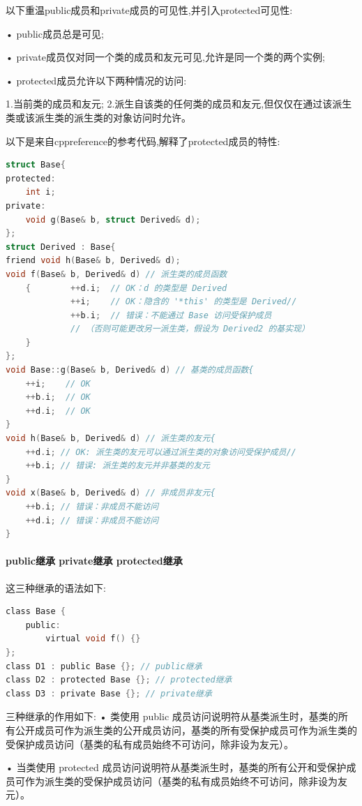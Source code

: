 \documentclass[UTF8]{ctexart}
\begin{document}
以下重温public成员和private成员的可见性,并引入protected可见性:

• public成员总是可见;

• private成员仅对同一个类的成员和友元可见,允许是同一个类的两个实例;

• protected成员允许以下两种情况的访问:

1.当前类的成员和友元;
2.派生自该类的任何类的成员和友元,但仅仅在通过该派生类或该派生类的派生类的对象访问时允许。

以下是来自cppreference的参考代码,解释了protected成员的特性:
\begin{lstlisting}[language = C,basicstyle=\small\ttfamily]
struct Base{
protected:    
    int i;
private:   
    void g(Base& b, struct Derived& d);
};
struct Derived : Base{    
friend void h(Base& b, Derived& d);    
void f(Base& b, Derived& d) // 派生类的成员函数    
    {        ++d.i;  // OK：d 的类型是 Derived        
             ++i;    // OK：隐含的 '*this' 的类型是 Derived//      
             ++b.i;  // 错误：不能通过 Base 访问受保护成员                
             // （否则可能更改另一派生类，假设为 Derived2 的基实现）    
    }
};
void Base::g(Base& b, Derived& d) // 基类的成员函数{    
    ++i;    // OK    
    ++b.i;  // OK   
    ++d.i;  // OK
}
void h(Base& b, Derived& d) // 派生类的友元{    
    ++d.i; // OK: 派生类的友元可以通过派生类的对象访问受保护成员// 
    ++b.i; // 错误: 派生类的友元并非基类的友元
}
void x(Base& b, Derived& d) // 非成员非友元{    
    ++b.i; // 错误：非成员不能访问 
    ++d.i; // 错误：非成员不能访问
}
\end{lstlisting}

\paragraph{public继承 private继承 protected继承}
这三种继承的语法如下:
\begin{lstlisting}[language = C,basicstyle=\small\ttfamily]
class Base { 
    public: 
        virtual void f() {}
};
class D1 : public Base {}; // public继承
class D2 : protected Base {}; // protected继承
class D3 : private Base {}; // private继承
\end{lstlisting}
三种继承的作用如下:
• 类使用 public 成员访问说明符从基类派生时，基类的所有公开成员可作为派生类的公开成员访问，基类的所有受保护成员可作为派生类的受保护成员访问（基类的私有成员始终不可访问，除非设为友元）。

• 当类使用 protected 成员访问说明符从基类派生时，基类的所有公开和受保护成员可作为派生类的受保护成员访问（基类的私有成员始终不可访问，除非设为友元）。
\end{document}

